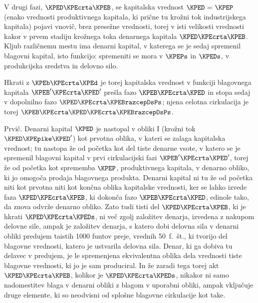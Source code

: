 \documentclass[kapital_02.tex]{subfiles}
\begin{document}
V drugi fazi, \( \KPED \KPEcrta \KPEB \), se kapitalska vrednost \( \KPED \textrm{ = } \KPEP \) (enako vrednosti produktivnega kapitala, ki prične tu krožni tok industrijskega kapitala) pojavi vnovič, brez presežne vrednosti, torej v isti velikosti vrednosti kakor v prvem stadiju krožnega toka denarnega kapitala \( \KPED \KPEcrta \KPEB \). Kljub različnemu mestu ima denarni kapital, v katerega se je sedaj spremenil blagovni kapital, isto funkcijo: spremeniti se mora v \( \KPEPs \) in \( \KPEDs \), v produkcijska sredstva in delovno silo.

Hkrati z \( \KPEb \KPEcrta \KPEd \) je torej kapitalska vrednost v funkciji blagovnega kapitala \( \KPEB' \KPEcrta \KPED' \) prešla fazo \( \KPEB \KPEcrta \KPED \) in stopa sedaj v dopolnilno fazo \( \KPED \KPEcrta \KPEBrazcepDsPs \); njena celotna cirkulacija je torej \( \KPEB \KPEcrta \KPED \KPEcrta \KPEBrazcepDsPs \).

Prvič. Denarni kapital \( \KPED \) je nastopal v obliki I (krožni tok \( \KPED \KPEpike \KPED' \)) kot prvotna oblika, v kateri se zalaga kapitalska vrednost; tu nastopa že od početka kot del tiste denarne vsote, v katero se je spremenil blagovni kapital v prvi cirkulacijski fazi \( \KPEB' \KPEcrta \KPED' \), torej že od početka kot sprememba \( \KPEP \), produktivnega kapitala, v denarno obliko, ki jo omogoča prodaja blagovnega produkta. Denarni kapital ni tu že od početka niti kot prvotna niti kot končna oblika kapitalske \KPEstran vrednosti, ker se lahko izvede faza \( \KPED \KPEcrta \KPEB \), ki dokonča fazo \( \KPEB \KPEcrta \KPED \), edinole tako, da znova odvrže denarno obliko. Zato tudi tisti del \( \KPED \KPEcrta \KPEB \), ki je hkrati \( \KPED \KPEcrta \KPEDs \), ni več zgolj založitev denarja, izvedena z nakupom delovne sile, ampak je založitev denarja, s katero dobi delovna sila v denarni obliki predujem taistih 1000 funtov preje, vrednih 50\ f.\ št., ki tvorijo del blagovne vrednosti, katero je ustvarila delovna sila. Denar, ki ga dobiva tu delavec v predujem, je le spremenjena ekvivalentna oblika dela vrednosti tiste blagovne vrednosti, ki jo je sam produciral. In že zaradi tega torej akt \( \KPED \KPEcrta \KPEB \), kolikor je \( \KPED \KPEcrta \KPEDs \), nikakor ni samo nadomestitev blaga v denarni obliki z blagom v uporabni obliki, ampak vključuje druge elemente, ki so neodvisni od splošne blagovne cirkulacije kot take.
\end{document}
